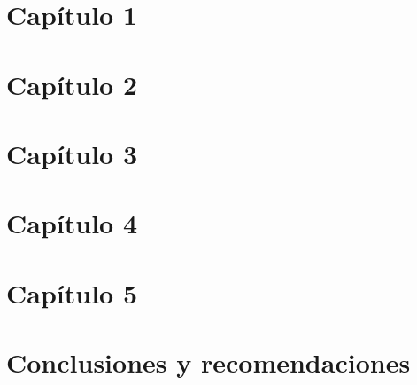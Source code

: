 \documentclass[12pt]{MIA-USA}
\begin{document}
    \chapter{Cap\'{i}tulo 1}
    
    
    \chapter{Cap\'{i}tulo 2}
    
    
    \chapter{Cap\'{i}tulo 3}
    
    
    \chapter{Cap\'{i}tulo 4}
    
    
    \chapter{Cap\'{i}tulo 5}
    
    
    \chapter{Conclusiones y recomendaciones}
    
    
    
    
    
    
    
\end{document}
